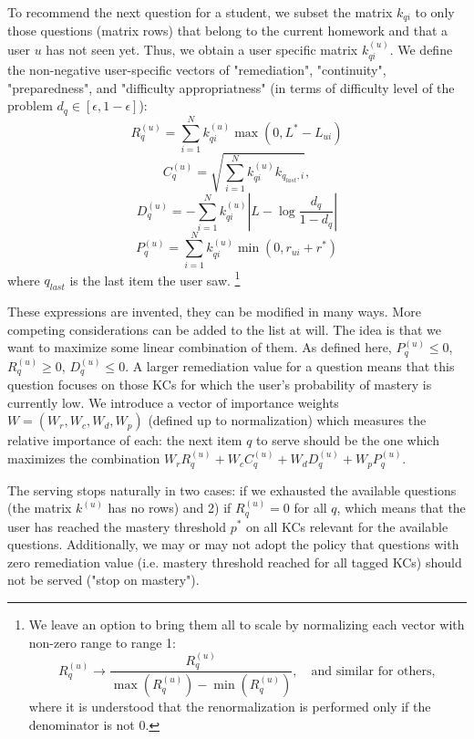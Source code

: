 \documentclass{sigchi}
\newcommand{\1}{\mathbf{1}}
\newcommand{\be}{\begin{equation}}
\newcommand{\ee}{\end{equation}}
\begin{document}
To recommend the next question for a student, we subset the matrix $k_{qi}$ to only those questions (matrix rows) that belong to the current homework and that a user $u$ has not seen yet. Thus, we obtain a user specific matrix $k_{qi}^{(u)}$. We define the non-negative user-specific vectors of "remediation", "continuity", "preparedness", and "difficulty appropriatness" (in terms of difficulty level of the problem $d_q\in[\epsilon,1-\epsilon]$):
\be
R_q^{(u)}=\sum_{i=1}^N k_{qi}^{(u)}\max\left(0,L^*-L_{ui}\right)
\ee
\be
C_q^{(u)}=\sqrt{\sum_{i=1}^N k_{qi}^{(u)}k_{q_{last},i}},
\ee
\be
D_q^{(u)}=-\sum_{i=1}^N k_{qi}^{(u)}\left|L-\log\frac{d_q}{1-d_q}\right|
\ee
\be
P_q^{(u)}=\sum_{i=1}^N k_{qi}^{(u)}\min(0,r_{ui}+r^*)
\ee
where $q_{last}$ is the last item the user saw.
\footnote{We leave an option to bring them all to scale by normalizing each vector with non-zero range to range 1:
\be
R_q^{(u)}\to\frac{R_q^{(u)}}{\max(R_q^{(u)})-\min(R_q^{(u)})},\quad \textrm{and similar for others},
\ee
where it is understood that the renormalization is performed only if the denominator is not 0.}

These expressions are invented, they can be modified in many ways. More competing considerations can be added to the list at will. The idea is that we want to maximize some linear combination of them. As defined here, $P_{q}^{(u)}\leq 0$, $R_{q}^{(u)}\geq 0$, $D_{q}^{(u)}\leq 0$. A larger remediation value for a question means that this question focuses on those KCs for which the user's probability of mastery is currently low. We introduce a vector of importance weights $W=(W_r,W_c,W_d,W_p)$ (defined up to normalization) which measures the relative importance of each: the next item $q$ to serve should be the one which maximizes the combination $W_rR_q^{(u)}+W_cC_q^{(u)}+W_dD_q^{(u)}+W_pP_q^{(u)}$. 

The serving stops naturally in two cases: if we exhausted the available questions (the matrix $k^{(u)}$ has no rows) and 2) if $R_q^{(u)}=0$ for all $q$, which means that the user has reached the mastery threshold $p^*$ on all KCs relevant for the available questions. Additionally, we may or may not adopt the policy that questions with zero remediation value (i.e. mastery threshold reached for all tagged KCs) should not be served ("stop on mastery").
\end{document}
